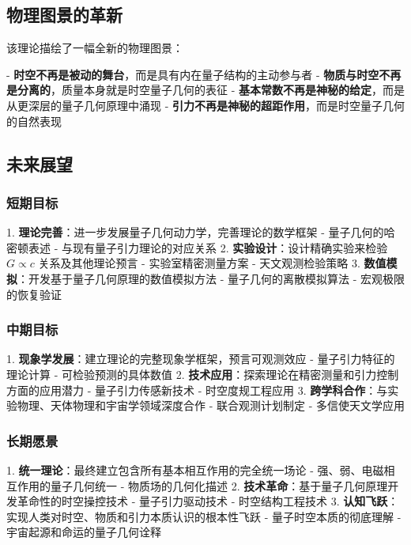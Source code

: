 \documentclass[12pt,twocolumn]{article}
\begin{document}
\subsection{物理图景的革新}

该理论描绘了一幅全新的物理图景：

- \textbf{时空不再是被动的舞台}，而是具有内在量子结构的主动参与者
- \textbf{物质与时空不再是分离的}，质量本身就是时空量子几何的表征
- \textbf{基本常数不再是神秘的给定}，而是从更深层的量子几何原理中涌现
- \textbf{引力不再是神秘的超距作用}，而是时空量子几何的自然表现

\subsection{未来展望}

\subsubsection{短期目标}

1. \textbf{理论完善}：进一步发展量子几何动力学，完善理论的数学框架
    - 量子几何的哈密顿表述
    - 与现有量子引力理论的对应关系
2. \textbf{实验设计}：设计精确实验来检验 $G \propto c$ 关系及其他理论预言
    - 实验室精密测量方案
    - 天文观测检验策略
3. \textbf{数值模拟}：开发基于量子几何原理的数值模拟方法
    - 量子几何的离散模拟算法
    - 宏观极限的恢复验证

\subsubsection{中期目标}

1. \textbf{现象学发展}：建立理论的完整现象学框架，预言可观测效应
    - 量子引力特征的理论计算
    - 可检验预测的具体数值
2. \textbf{技术应用}：探索理论在精密测量和引力控制方面的应用潜力
    - 量子引力传感新技术
    - 时空度规工程应用
3. \textbf{跨学科合作}：与实验物理、天体物理和宇宙学领域深度合作
    - 联合观测计划制定
    - 多信使天文学应用

\subsubsection{长期愿景}

1. \textbf{统一理论}：最终建立包含所有基本相互作用的完全统一场论
    - 强、弱、电磁相互作用的量子几何统一
    - 物质场的几何化描述
2. \textbf{技术革命}：基于量子几何原理开发革命性的时空操控技术
    - 量子引力驱动技术
    - 时空结构工程技术
3. \textbf{认知飞跃}：实现人类对时空、物质和引力本质认识的根本性飞跃
    - 量子时空本质的彻底理解
    - 宇宙起源和命运的量子几何诠释
\end{document}
